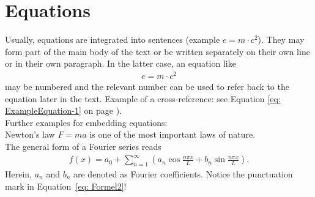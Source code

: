 \section{Equations}
Usually, equations are integrated into sentences (example $e=m\cdot c^2$). They may form part of the main body of the text or be written separately on their own line or in their own paragraph. In the latter case, an equation like
\begin{align}
	e=m\cdot c^2
	\label{eq: ExampleEquation-1}
\end{align}
may be numbered and the relevant number can be used to refer back to the equation later in the text. Example of a cross-reference: see Equation \ref{eq: ExampleEquation-1} on page \pageref{eq: ExampleEquation-1}).
\vspace{6pt}\\
Further examples for embedding equations:
\\
Newton's law $F=ma$ is one of the most important laws of nature.
\\
The general form of a Fourier series reads
%
\begin{align}
f(x)=a_0 +\sum_{n=1}^\infty \left( a_n \cos\frac{n\pi x}{L} + b_n \sin\frac{n\pi x}{L} \right) .
\label{eq: Formel2}
\end{align}
%
Herein, $a_n$ and $b_n$ are denoted as Fourier coefficients. Notice the punctuation mark
in Equation~\ref{eq: Formel2}!


